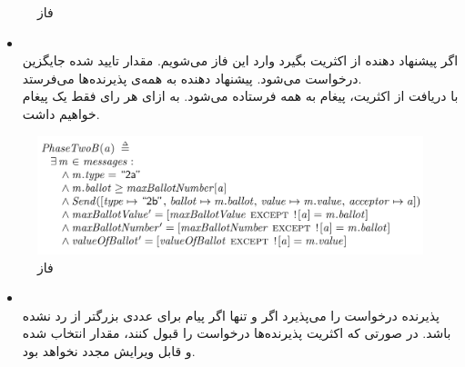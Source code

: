 \documentclass{article}
\begin{document}
\begin{multicols}{2}
\begin{figure}[H]
    \caption{
    فاز
    }
    \label{fig:my_label}
\end{figure}
\begin{itemize}
    \item {}\\
    اگر پیشنهاد دهنده از اکثریت
    بگیرد وارد این فاز می‌شویم. مقدار تایید شده جایگزین درخواست
    می‌شود. پیشنهاد دهنده به همه‌ی پذیرنده‌ها
    می‌فرستد.\\
    با دریافت
    از اکثریت، پیغام
    به همه فرستاده می‌شود. به ازای هر رای فقط یک پیغام
    خواهیم داشت.
\end{itemize}
\begin{figure}[H]
    \centering
    \includegraphics[width=0.99\linewidth]{Photos/HW6/twoB.png}
    \caption{
    فاز
    }
    \label{fig:my_label}
\end{figure}
\begin{itemize}
    \item {}\\
    پذیرنده درخواست
    را می‌پذیرد اگر و تنها اگر پیام
    برای عددی بزرگتر از
    رد نشده باشد. در صورتی که اکثریت پذیرنده‌ها درخواست را قبول کنند، مقدار انتخاب شده و قابل ویرایش مجدد نخواهد بود.
\end{itemize}

\end{multicols}
\end{document}
